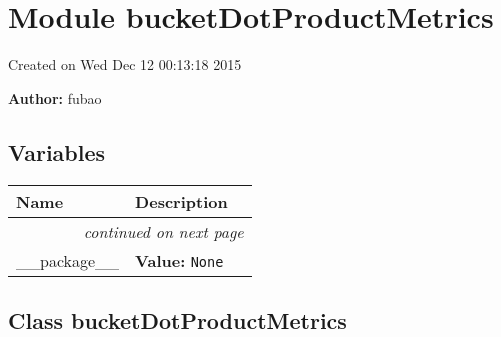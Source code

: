 %
%
%


\section{Module bucketDotProductMetrics}

    \label{bucketDotProductMetrics}
Created on Wed Dec  12 00:13:18 2015

\textbf{Author:} fubao





  \subsection{Variables}

    \vspace{-1cm}
\hspace{\varindent}\begin{longtable}{|p{\varnamewidth}|p{\vardescrwidth}|l}
\cline{1-2}
\cline{1-2} \centering \textbf{Name} & \centering \textbf{Description}& \\
\cline{1-2}
\endhead\cline{1-2}\multicolumn{3}{r}{\small\textit{continued on next page}}\\\endfoot\cline{1-2}
\endlastfoot\raggedright \_\-\_\-p\-a\-c\-k\-a\-g\-e\-\_\-\_\- & \raggedright \textbf{Value:} 
{\tt None}&\\
\cline{1-2}
\end{longtable}



\subsection{Class bucketDotProductMetrics}

